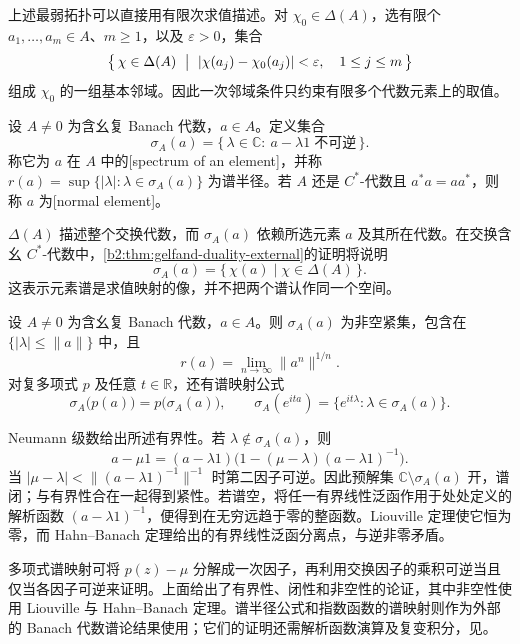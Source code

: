 \ProseParagraphBreak
上述最弱拓扑可以直接用有限次求值描述。对 \(\chi_0\in\Delta(A)\)，选有限个 \(a_1,\ldots,a_m\in A\)、\(m\ge1\)，以及 \(\varepsilon>0\)，集合
\[
	\left\{\,\chi\in\Delta(A)\ \bigm\vert\ |\chi(a_j)-\chi_0(a_j)|<\varepsilon, \quad 1\le j\le m\,\right\}
\]
组成 \(\chi_0\) 的一组基本邻域。因此一次邻域条件只约束有限多个代数元素上的取值。

\begin{definition}\label{b2:def:banach-element-spectrum}
	设 \(A\ne0\) 为含幺复 Banach 代数，\(a\in A\)。定义集合
	\[
		\sigma_A(a)=\{\,\lambda\in\mathbb C:\ a-\lambda1\;\text{不可逆}\,\}.
	\]
	称它为 \(a\) 在 \(A\) 中的[spectrum of an element]，并称 \(r(a)=\sup\{|\lambda|:\lambda\in\sigma_A(a)\}\) 为谱半径。若 \(A\) 还是 \(C^*\)-代数且 \(a^*a=aa^*\)，则称 \(a\) 为[normal element]。
\end{definition}

\(\Delta(A)\) 描述整个交换代数，而 \(\sigma_A(a)\) 依赖所选元素 \(a\) 及其所在代数。在交换含幺 \(C^*\)-代数中，\cref{b2:thm:gelfand-duality-external}的证明将说明
\[
	\sigma_A(a)=\{\,\chi(a)\mid\chi\in\Delta(A)\,\}.
\]
这表示元素谱是求值映射的像，并不把两个谱认作同一个空间。

\begin{lemma}\label{b2:lem:banach-spectral-inputs}
	设 \(A\ne0\) 为含幺复 Banach 代数，\(a\in A\)。则 \(\sigma_A(a)\) 为非空紧集，包含在 \(\{|\lambda|\le\|a\|\}\) 中，且
	\[
		r(a)=\lim_{n\to\infty}\|a^n\|^{1/n}.
	\]
	对复多项式 \(p\) 及任意 \(t\in\mathbb R\)，还有谱映射公式
	\[
		\sigma_A\bigl(p(a)\bigr)=p\bigl(\sigma_A(a)\bigr),\qquad \sigma_A(e^{ita})=\{e^{it\lambda}:\lambda\in\sigma_A(a)\}.
	\]
\end{lemma}

\begin{proofsketch}
	Neumann 级数给出所述有界性。若 \(\lambda\notin\sigma_A(a)\)，则
	\[
		a-\mu1=(a-\lambda1)\bigl(1-(\mu-\lambda)(a-\lambda1)^{-1}\bigr).
	\]
	当 \(|\mu-\lambda|<\|(a-\lambda1)^{-1}\|^{-1}\) 时第二因子可逆。因此预解集 \(\mathbb C\setminus\sigma_A(a)\) 开，谱闭；与有界性合在一起得到紧性。若谱空，将任一有界线性泛函作用于处处定义的解析函数 \((a-\lambda1)^{-1}\)，便得到在无穷远趋于零的整函数。Liouville 定理使它恒为零，而 Hahn--Banach 定理给出的有界线性泛函分离点，与逆非零矛盾。

	多项式谱映射可将 \(p(z)-\mu\) 分解成一次因子，再利用交换因子的乘积可逆当且仅当各因子可逆来证明。上面给出了有界性、闭性和非空性的论证，其中非空性使用 Liouville 与 Hahn--Banach 定理。谱半径公式和指数函数的谱映射则作为外部的 Banach 代数谱论结果使用；它们的证明还需解析函数演算及复变积分，见\cite[Proposition II.1.4.2(i)--(iii); Proposition II.1.5.2(i); II.1.5.3]{Blackadar2017OperatorAlgebrasCorrected}。
\end{proofsketch}

